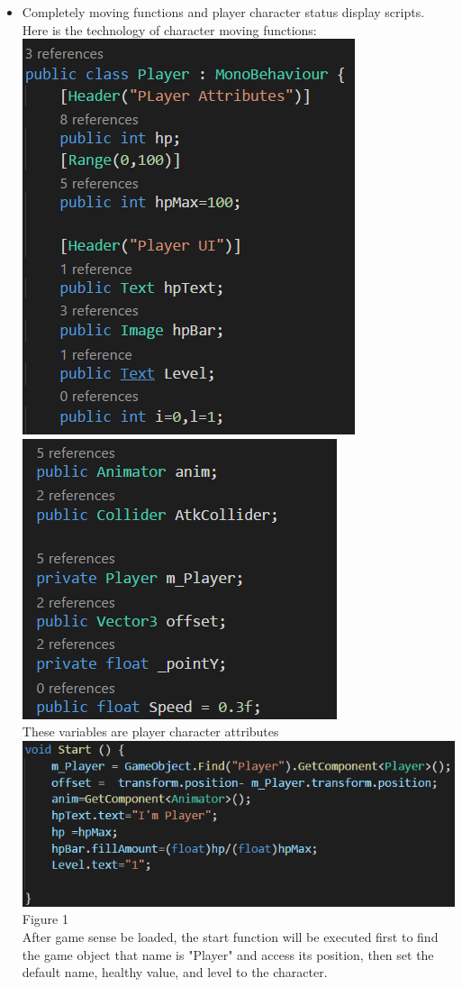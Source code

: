 \begin{itemize}
\item Completely moving functions and player character status display scripts.
\\
Here is the technology of character moving functions:\\
\includegraphics[scale=0.5]{img/Attributes1.png}
\includegraphics[scale=0.5]{img/Attributes2.png}\\
These variables are player character attributes\\

\includegraphics[scale=0.5]{img/Character.png}\\{Figure 1}\\
After game sense be loaded, the start function will be executed first to find the game object that name is "Player" and access its position, then set the default name, healthy value, and level to the character.\\


\end{itemize}
